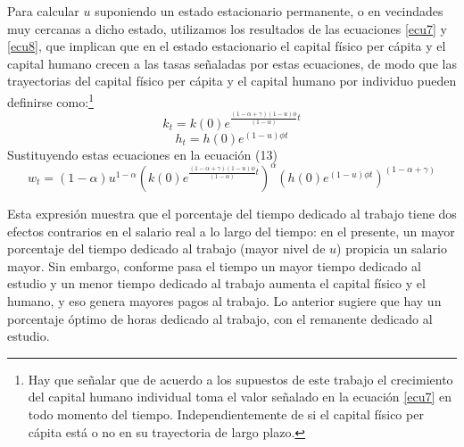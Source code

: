 \documentclass[12pt,notitlepage]{report}
\newcommand{\suma}{(1-\alpha + \gamma)}
\newcommand{\fphi}{\frac{\suma (1-u)\phi}{(1-\alpha)}}
\begin{document}
	\addtocounter{footnote}{12}
	
	Para calcular $u$ suponiendo un estado estacionario permanente, o en vecindades muy cercanas a dicho estado, utilizamos los resultados de las ecuaciones \ref{ecu7} y \ref{ecu8}, que implican que en el estado estacionario el capital físico per cápita y el capital humano crecen a las tasas señaladas por estas ecuaciones, de modo que las trayectorias del capital físico per cápita y el capital humano por individuo pueden definirse como:\footnote{Hay que señalar que de acuerdo a los supuestos de este trabajo el crecimiento del capital humano individual toma el valor señalado en la ecuación \ref{ecu7} en todo momento del tiempo. Independientemente de si el capital físico per cápita está o no en su trayectoria de largo plazo.}
	\begin{equation}\label{ecu14}
		k_t=k(0)e^{\fphi t}
	\end{equation}
	\begin{equation}\label{ecu15}
		h_t=h(0)e^{(1-u)\phi t}
	\end{equation}
	Sustituyendo estas ecuaciones en la ecuación (13)
	\begin{equation}\label{ecu16}
		w_t=(1-\alpha)u^{1-\alpha}(k(0)e^{\fphi t})^\alpha(h(0)e^{(1-u)\phi t})^{\suma}
	\end{equation}
	
	Esta expresión muestra que el porcentaje del tiempo dedicado al trabajo tiene dos efectos contrarios en el salario real a lo largo del tiempo: en el presente, un mayor porcentaje del tiempo dedicado al trabajo (mayor nivel de $u$) propicia un salario mayor. Sin embargo, conforme pasa el tiempo un mayor tiempo dedicado al estudio y un menor tiempo dedicado al trabajo aumenta el capital físico y el humano, y eso genera mayores pagos al trabajo. Lo anterior sugiere que hay un porcentaje óptimo de horas dedicado al trabajo, con el remanente dedicado al estudio.
	
\end{document}
